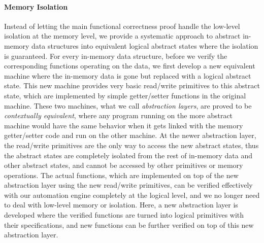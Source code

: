 \paragraph{Memory Isolation}
Instead of letting the main functional correctness proof handle the low-level
isolation at the memory level,  we provide a systematic approach to abstract in-memory
data structures into equivalent logical abstract states where the isolation is guaranteed.
For every in-memory data structure, before we verify the corresponding functions operating
on the data, we first develop a new equivalent machine where the in-memory data is gone but replaced
with a logical abstract state. This new machine provides very basic read/write primitives to this
abstract state, which are implemented by simple getter/setter functions in the original machine.
These two machines, what we call {\it abstraction layers}, are proved to be {\it contextually equivalent},
where any program running on the more abstract machine would have the same behavior when it gets
linked with the memory getter/setter code and  run on the other machine.
At the newer abstraction layer, the read/write primitives are the only way to access the new abstract
states, thus the abstract states are completely isolated from the rest of in-memory data and other
abstract states, and cannot be accessed by other primitives or memory operations.
The actual functions, which are implemented on top of the new abstraction layer
using the new read/write primitives, can be verified
effectively with our automation engine completely at the logical level, and we no longer need to deal with
low-level memory or isolation. Here, a new abstraction layer is developed where the verified
functions are turned into logical primitives with their specifications, and new functions can be
further verified on top of this new abstraction layer.

